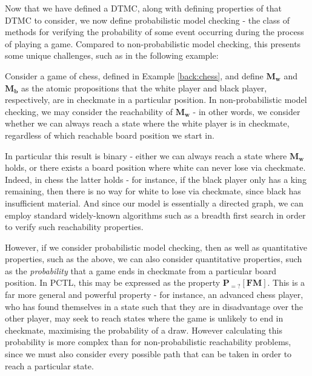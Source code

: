 Now that we have defined a DTMC, along with defining properties of that DTMC to consider, we now define probabilistic model checking - the class of methods for verifying the probability of some event occurring during the process of playing a game. Compared to non-probabilistic model checking, this presents some unique challenges, such as in the following example:

\begin{example}
\label{back:chess-reachability}
    Consider a game of chess, defined in Example \ref{back:chess}, and define $\mathbf{M_w}$ and $\mathbf{M_b}$ as the atomic propositions that the white player and black player, respectively, are in checkmate in a particular position. In non-probabilistic model checking, we may consider the reachability of $\mathbf{M_w}$ - in other words, we consider whether we can always reach a state where the white player is in checkmate, regardless of which reachable board position we start in.
    
    In particular this result is binary - either we can always reach a state where $\mathbf{M_w}$ holds, or there exists a board position where white can never lose via checkmate. Indeed, in chess the latter holds - for instance, if the black player only has a king remaining, then there is no way for white to lose via checkmate, since black has insufficient material. And since our model is essentially a directed graph, we can employ standard widely-known algorithms such as a breadth first search in order to verify such reachability properties.

    However, if we consider probabilistic model checking, then as well as quantitative properties, such as the above, we can also consider quantitative properties, such as the \emph{probability} that a game ends in checkmate from a particular board position. In PCTL, this may be expressed as the property $\mathbf{P}_{=?} [\mathbf{F} \mathbf{M}]$. This is a far more general and powerful property - for instance, an advanced chess player, who has found themselves in a state such that they are in disadvantage over the other player, may seek to reach states where the game is unlikely to end in checkmate, maximising the probability of a draw. However calculating this probability is more complex than for non-probabilistic reachability problems, since we must also consider every possible path that can be taken in order to reach a particular state.

\end{example}

